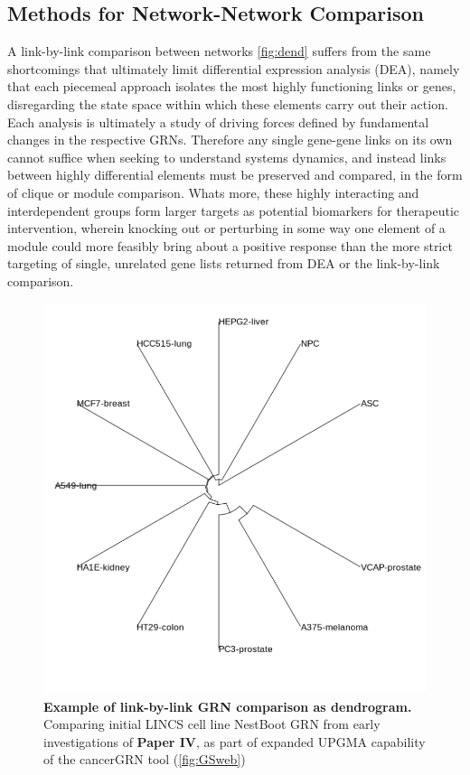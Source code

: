 \subsection{Methods for Network-Network Comparison}
\label{sec:net_com}
A link-by-link comparison between networks \cref{fig:dend} suffers from the same shortcomings that ultimately limit differential expression analysis (DEA), namely that each piecemeal approach isolates the most highly functioning links or genes, disregarding the state space within which these elements carry out their action. Each analysis is ultimately a study of driving forces defined by fundamental changes in the respective GRNs. Therefore any single gene-gene links on its own cannot suffice when seeking to understand systems dynamics, and instead links between highly differential elements must be preserved and compared, in the form of clique or module comparison. Whats more, these highly interacting and interdependent groups form larger targets as potential biomarkers for therapeutic intervention, wherein knocking out or perturbing in some way one element of a module could more feasibly bring about a positive response than the more strict targeting of single, unrelated gene lists returned from DEA or the link-by-link comparison.

\begin{figure}
\centering
\includegraphics[width=.75\linewidth]{4/better_dendrogram.png}
\caption{\textbf{Example of link-by-link GRN comparison as dendrogram.} Comparing initial LINCS cell line NestBoot GRN from early investigations of \textbf{Paper IV}, as part of expanded UPGMA capability of the cancerGRN tool (\cref{fig:GSweb})}%
\label{fig:UPGMA}%
\end{figure}

